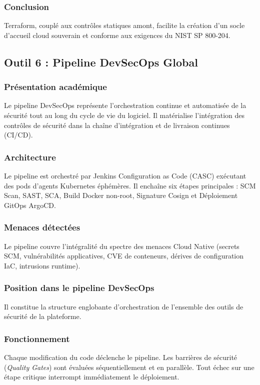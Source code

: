 \subsubsection{Conclusion}
Terraform, couplé aux contrôles statiques amont, facilite la création d'un socle d'accueil cloud souverain et conforme aux exigences du NIST SP 800-204.

\subsection{Outil 6 : Pipeline DevSecOps Global}
\label{subsec:outil_pipeline_global}

\subsubsection{Présentation académique}
Le pipeline DevSecOps représente l'orchestration continue et automatisée de la sécurité tout au long du cycle de vie du logiciel. Il matérialise l'intégration des contrôles de sécurité dans la chaîne d'intégration et de livraison continues (CI/CD).

\subsubsection{Architecture}
Le pipeline est orchestré par Jenkins Configuration as Code (CASC) exécutant des pods d'agents Kubernetes éphémères. Il enchaîne six étapes principales : SCM Scan, SAST, SCA, Build Docker non-root, Signature Cosign et Déploiement GitOps ArgoCD.

\subsubsection{Menaces détectées}
Le pipeline couvre l'intégralité du spectre des menaces Cloud Native (secrets SCM, vulnérabilités applicatives, CVE de conteneurs, dérives de configuration IaC, intrusions runtime).

\subsubsection{Position dans le pipeline DevSecOps}
Il constitue la structure englobante d'orchestration de l'ensemble des outils de sécurité de la plateforme.

\subsubsection{Fonctionnement}
Chaque modification du code déclenche le pipeline. Les barrières de sécurité (\textit{Quality Gates}) sont évaluées séquentiellement et en parallèle. Tout échec sur une étape critique interrompt immédiatement le déploiement.


